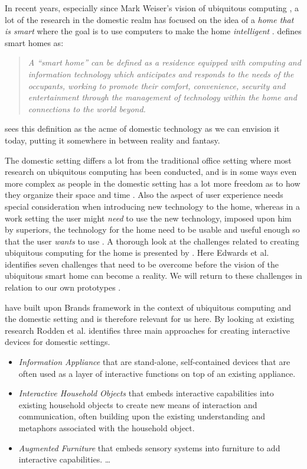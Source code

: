 In recent years, especially since Mark Weiser's vision of ubiquitous computing \citep{weiser1991computer}, a lot of the research in the domestic realm has focused on the idea of a \emph{home that is smart} where the goal is to use computers to make the home \emph{intelligent} \citep{taylor2007homes}.
\citet{aldrich2003smart} defines smart homes as:

\begin{quotation}
\emph{A ``smart home'' can be defined as a residence equipped with computing and information technology which anticipates and responds to the needs of the occupants, working to promote their comfort, convenience, security and entertainment through the management of technology within the home and connections to the world beyond.}
\end{quotation}
\citeauthor{aldrich2003smart} sees this definition as the acme of domestic technology as we can envision it today, putting it somewhere in between reality and fantasy.

The domestic setting differs a lot from the traditional office setting where most research on ubiquitous computing has been conducted, and is in some ways even more complex as people in the domestic setting has a lot more freedom as to how they organize their space and time \cite{meyer2003survey}.
Also the aspect of user experience needs special consideration when introducing new technology to the home, whereas in a work setting the user might \emph{need} to use the new technology, imposed upon him by superiors, the technology for the home need to be usable and useful enough so that the user \emph{wants} to use \citep{meyer2003survey}.
A thorough look at the challenges related to creating ubiquitous computing for the home is presented by \citet{edwards2001home}.
Here Edwards et al. identifies seven challenges that need to be overcome before the vision of the ubiquitous smart home can become a reality. We will return to these challenges in relation to our own prototypes .

\citet{rodden2003evolution} have built upon Brands framework in the context of ubiquitous computing and the domestic setting and is therefore relevant for us here.
By looking at existing research Rodden et al. identifies three main approaches for creating interactive devices for domestic settings.

\begin{itemize}
  \item \emph{Information Appliance} that are stand-alone, self-contained devices that are often used as a layer of interactive functions on top of an existing appliance.
  \item \emph{Interactive Household Objects} that embeds interactive capabilities into existing household objects to create new means of interaction and communication, often building upon the existing understanding and metaphors associated with the household object.
  \item \emph{Augmented Furniture} that embeds sensory systems into furniture to add interactive capabilities. \ldots
\end{itemize}

